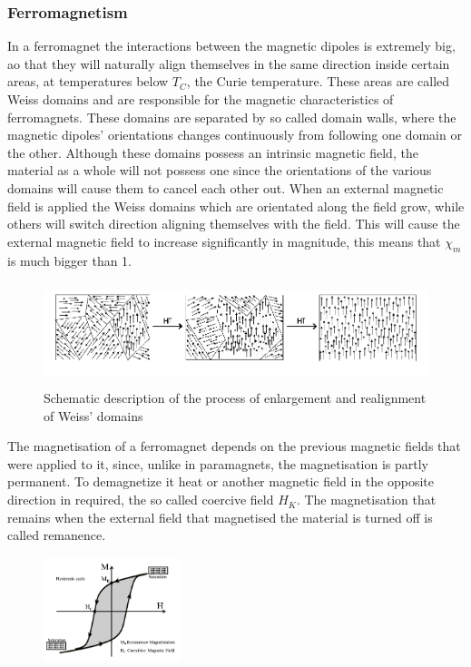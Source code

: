 \documentclass[12pt]{article}
\begin{document}
		\subsubsection{Ferromagnetism}
		In a ferromagnet the interactions between the magnetic dipoles is extremely big, ao that they will naturally align themselves in the same direction inside certain areas, at temperatures below $T_C$, the Curie temperature. These areas are called Weiss domains and are responsible for the magnetic characteristics of ferromagnets. These domains are separated by so called domain walls, where the magnetic dipoles' orientations changes continuously from following one domain or the other. Although these domains possess an intrinsic magnetic field, the material as a whole will not possess one since the orientations of the various domains will cause them to cancel each other out. When an external magnetic field is applied the Weiss domains which are orientated along the field grow, while others will switch direction aligning themselves with the field. This will cause the external magnetic field to increase significantly in magnitude, this means that $\chi_m$ is much bigger than 1.
		
			\begin{figure} [h] \label{fig:weiss}
			\centering
			\includegraphics[height=3cm]{weiss.jpg}
			\caption{Schematic description of the process of enlargement and realignment of Weiss' domains}
		\end{figure}
		
		The magnetisation of a ferromagnet depends on the previous magnetic fields that were applied to it, since, unlike in paramagnets, the magnetisation is partly permanent. To demagnetize it heat or another magnetic field in the opposite direction in required, the so called coercive field $H_K$. The magnetisation that remains when the external field that magnetised the material is turned off is called remanence. 
		
			\begin{figure} [h]\label{fig:hyst}
			\centering
			\includegraphics[height=3cm]{hysterese.jpg}
			\end{figure}
		
\end{document}
